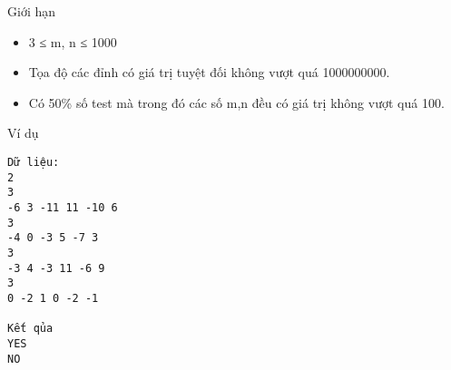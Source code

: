 Giới hạn  
\begin{itemize}
	\item     3 ≤ m, n ≤ 1000   
	\item     Tọa độ các đỉnh có giá trị tuyệt đối không vượt quá 1000000000.   
	\item     Có 50\% số test mà trong đó các số m,n đều có giá trị không vượt quá 100.   
\end{itemize}
   Ví dụ  
\begin{verbatim}
Dữ liệu:
2
3
-6 3 -11 11 -10 6 
3
-4 0 -3 5 -7 3 
3
-3 4 -3 11 -6 9 
3
0 -2 1 0 -2 -1 

Kết qủa
YES
NO
\end{verbatim}